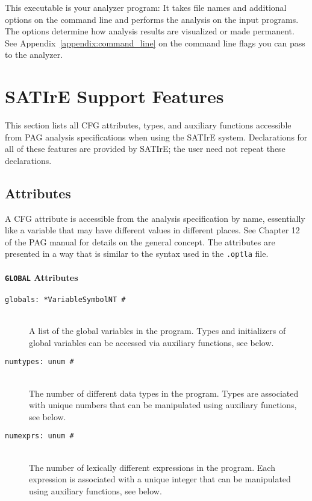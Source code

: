 \documentclass[a4paper,12pt]{report}
\begin{document}
This executable is your analyzer program: It takes file names and additional
options on the command line and performs the analysis on the input programs.
The options determine how analysis results are visualized or made permanent.
See Appendix~\ref{appendix:command_line} on the command line flags you can
pass to the analyzer.

\section{SATIrE Support Features}
\label{sec:support_stuff}

This section lists all CFG attributes, types, and auxiliary functions
accessible from PAG analysis specifications when using the SATIrE system.
Declarations for all of these features are provided by SATIrE; the user need
not repeat these declarations.

\newcommand{\ttitemX}[1]{\item[\texttt{#1}]}
\newcommand{\ttitem}[1]{\ttitemX{#1} \mbox{} \\}

\subsection{Attributes}
\label{sec:support_attributes}

A CFG attribute is accessible from the analysis specification by name,
essentially like a variable that may have different values in different
places. See Chapter 12 of the PAG manual for details on the general concept.
The attributes are presented in a way that is similar to the syntax used in
the \texttt{.optla} file.


\paragraph{\texttt{GLOBAL} Attributes}
\begin{description}
\ttitem{globals: *VariableSymbolNT \#}
    A list of the global variables in the program. Types and initializers of
    global variables can be accessed via auxiliary functions, see below.

\ttitem{numtypes: unum \#}
    The number of different data types in the program. Types are associated
    with unique numbers that can be manipulated using auxiliary functions,
    see below.

\ttitem{numexprs: unum \#}
    The number of lexically different expressions in the program. Each
    expression is associated with a unique integer that can be manipulated
    using auxiliary functions, see below.
\end{description}
\end{document}
